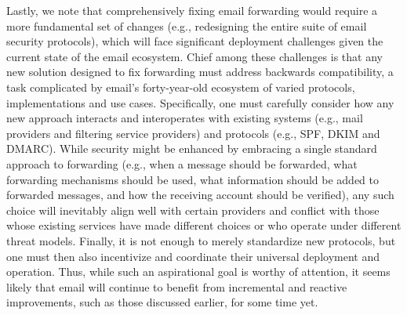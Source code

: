 Lastly, we note that comprehensively fixing email forwarding would
require a more fundamental set of changes (e.g., redesigning the
entire suite of email security protocols), which will face significant
deployment challenges given the current state of the email ecosystem.
Chief among these challenges is that any new solution designed to fix
forwarding must address backwards compatibility, a task complicated by
email's forty-year-old ecosystem of varied protocols, implementations
and use cases.  Specifically, one must carefully consider how any new
approach interacts and interoperates with existing systems (e.g., mail
providers and filtering service providers) and protocols (e.g., SPF,
DKIM and DMARC).  While security might be enhanced by embracing a
single standard approach to forwarding (e.g., when a message
should be forwarded, what forwarding mechanisms should be used, what
information should be added to forwarded messages, and how the
receiving account should be verified), any such choice will inevitably
  align well with certain providers and conflict with those whose
  existing services have made different choices or who operate under
  different threat models.  Finally, it is not enough to merely
  standardize new protocols, but one must then also incentivize and
  coordinate their universal deployment and operation.  Thus, while
  such an aspirational goal is worthy of attention, it seems likely
  that email will continue to benefit from incremental and reactive
  improvements, such as those discussed earlier, for some time yet.

